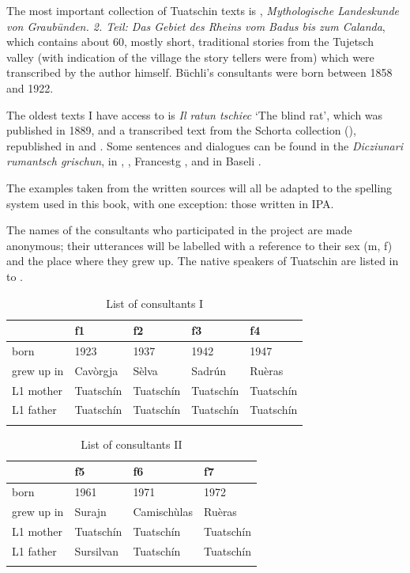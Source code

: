 The most important collection of Tuatschin texts is \citet{Büchli1966}, \textit{Mythologische Landeskunde von Graubünden. 2. Teil: Das Gebiet des Rheins vom Badus bis zum Calanda}, which contains about 60, mostly short, traditional stories from the Tujetsch valley (with indication of the village the story tellers were from) which were transcribed by the author himself. Büchli's consultants were born between 1858 and 1922.

The oldest texts I have access to is \textit{Il ratun tschiec} `The blind rat', which was published in 1889, and a transcribed text from the Schorta collection  (\citet{Schorta1926}), republished in \citet{Valär2013a} and \citet{Valär2013b}. Some sentences and dialogues can be found in the \textit{Dicziunari rumantsch grischun}, in \citet{Gartner1910}, \citet{Gadola1935}, Francestg \citet{Berther1998}, and in Baseli \citet{Berther2007}. 

The examples taken from the written sources will all be adapted to the spelling system used in this book, with one exception: those written in IPA.
  
The names of the consultants who participated in the project are made anonymous; their utterances will be labelled with a reference to their sex (m, f) and the place where they grew up. The native speakers of Tuatschin are listed in  to .

\begin{table}
	\caption{List of consultants I}
	\label{tab:consultantsI}
	\begin{tabular}{lllll}
		\lsptoprule
		& f1 & f2 & f3 & f4\\
		\midrule
		born & 1923 & 1937 & 1942 & 1947\\
		grew up in & Cavòrgja & Sèlva & Sadrún & Ruèras \\
		L1 mother & Tuatschín & Tuatschín & Tuatschín & Tuatschín \\
		L1 father & Tuatschín & Tuatschín & Tuatschín & Tuatschín \\
		\lspbottomrule
	\end{tabular}
\end{table}

\begin{table}
	\caption{List of consultants II}
	\label{tab:consultantsII}
	\begin{tabular}{llll}
		\lsptoprule
		& f5 & f6 & f7 \\
		\midrule
		born &  1961 & 1971 & 1972 \\
		grew up in &  Surajn &  Camischùlas &  Ruèras  \\
		L1 mother & Tuatschín & Tuatschín & Tuatschín\\
		L1 father & Sursilvan & Tuatschín & Tuatschín\\
		\lspbottomrule
	\end{tabular}
\end{table}

